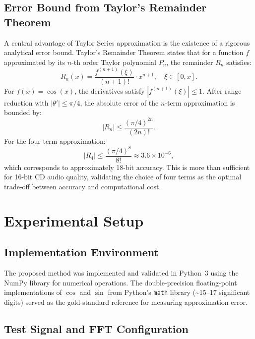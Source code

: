 \documentclass[conference]{IEEEtran}
\begin{document}
\subsection{Error Bound from Taylor's Remainder Theorem}

A central advantage of Taylor Series approximation is the existence of a
rigorous analytical error bound. Taylor's Remainder Theorem states that for a
function $f$ approximated by its $n$-th order Taylor polynomial $P_n$, the
remainder $R_n$ satisfies:
\begin{equation}
R_n(x) = \frac{f^{(n+1)}(\xi)}{(n+1)!} \cdot x^{n+1}, \quad \xi \in [0, x].
\label{eq:taylor_remainder}
\end{equation}
For $f(x) = \cos(x)$, the derivatives satisfy $|f^{(n+1)}(\xi)| \leq 1$. After
range reduction with $|\theta'| \leq \pi/4$, the absolute error of the $n$-term
approximation is bounded by:
\begin{equation}
|R_n| \leq \frac{(\pi/4)^{2n}}{(2n)!}.
\label{eq:error_bound}
\end{equation}
For the four-term approximation:
\begin{equation}
|R_4| \leq \frac{(\pi/4)^8}{8!} \approx 3.6 \times 10^{-6},
\end{equation}
which corresponds to approximately 18-bit accuracy. This is more than sufficient
for 16-bit CD audio quality, validating the choice of four terms as the optimal
trade-off between accuracy and computational cost.

\section{Experimental Setup}
\label{sec:experiment}

\subsection{Implementation Environment}

The proposed method was implemented and validated in Python~3 using the NumPy
library for numerical operations. The double-precision floating-point
implementations of $\cos$ and $\sin$ from Python's \texttt{math} library
(\textasciitilde15--17 significant digits) served as the gold-standard reference
for measuring approximation error.

\subsection{Test Signal and FFT Configuration}
\end{document}
